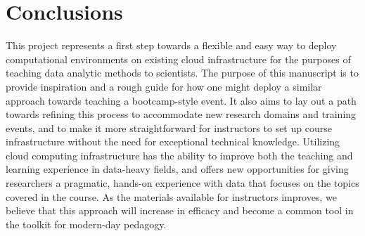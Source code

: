 \section{Conclusions}

This project represents a first step towards a flexible and easy way to deploy
computational environments on existing cloud infrastructure for the purposes of
teaching data analytic methods to scientists. The purpose of this manuscript is
to provide inspiration and a rough guide for how one might deploy a similar
approach towards teaching a bootcamp-style event. It also aims to lay out a path
towards refining this process to accommodate new research domains and training
events, and to make it more straightforward for instructors to set up course
infrastructure without the need for exceptional technical knowledge. Utilizing
cloud computing infrastructure has the ability to improve both the teaching and
learning experience in data-heavy fields, and offers new opportunities for
giving researchers a pragmatic, hands-on experience with data that focuses on
the topics covered in the course. As the materials available for instructors
improves, we believe that this approach will increase in efficacy and become a
common tool in the toolkit for modern-day pedagogy.
